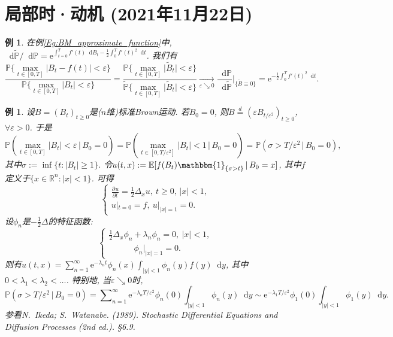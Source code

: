\documentclass{ctexart}
\theoremstyle{definition}
\theoremstyle{remark}
\theoremstyle{plain}
\newtheorem{Eg}[Def]{例}
\newcommand{\1}{\mathbbm{1}}				%
\renewcommand{\P}{\mathbb{P}}				%
\newcommand{\E}{\mathbb{E}}					%
\newcommand{\abs}[1]{\lvert#1\rvert}			%
\newcommand{\R}{\mathbb{R}}					%
\newcommand{\tsum}{\textstyle\sum\nolimits}
\renewcommand*{\d}{\mathop{}\!\mathrm{d}}	%
\newcommand{\pd}{\partial}					%
\newcommand{\p}[3][]{\frac{\pd^{#1}#2}{\pd{#3}^{#1}}}%
\newcommand{\e}{\mathrm{e}}
\begin{document}
\section{局部时·动机 \normalfont\footnotesize (2021年11月22日)}
\begin{Eg}
在例\ref{Eg:BM_approximate_function}中, $\d\tilde{\P}/\d\P = \e^{\int_{t=0}^{T} f'(t) \d B_{t} - \frac{1}{2} \int_{0}^{T} f'(t)^{2} \d t}$. 我们有
\[ \frac{\P\{ \max_{t \in [0,T]} \abs{B_{t}-f(t)} < \varepsilon \}}{\P\{ \max_{t \in [0,T]} \abs{B_{t}} < \varepsilon \}} = \frac{\P\{ \max_{t \in [0,T]} \abs{\tilde{B}_{t}} < \varepsilon \}}{\tilde{\P}\{ \max_{t \in [0,T]} \abs{\tilde{B}_{t}} < \varepsilon \}} \xrightarrow[\varepsilon \searrow 0]{} \frac{\d\P}{\d\tilde{\P}}\bigg|_{\{\tilde{B} \equiv 0\}} = \e^{- \frac{1}{2} \int_{0}^{T} f'(t)^{2} \d t} . \]
\end{Eg}
\begin{Eg}
设$B = (B_{t})_{t \ge 0}$是($n$维)标准Brown运动. 若$B_{0} = 0$, 则$B \stackrel{d}{=} (\varepsilon B_{t/\varepsilon^2})_{t \ge 0}$, $\forall \varepsilon > 0$. 于是
\[ \P( \max_{t \in [0,T]} \abs{B_{t}} < \varepsilon \,|\, B_{0}=0 ) = \P( \max_{t \in [0,T/\varepsilon^{2}]} \abs{B_{t}} < 1 \,|\, B_{0}=0 ) = \P( \sigma > T/\varepsilon^{2} \,|\, B_{0}=0 ) , \] 其中$\sigma := \inf\{ t : \abs{B_{t}} \ge 1 \}$. 
令$u(t,x) := \E[ f(B_{t}) \1_{\{\sigma>t\}} \,|\, B_{0}=x ]$, 其中$f$定义于$\{ x \in \R^{n} : \abs{x} < 1 \}$. \clearpage\noindent
可得\[\begin{cases}
\p{u}{t} = \frac{1}{2} \Delta_{x} u , \ t \ge 0 ,\, \abs{x} < 1 , \\
u|_{t=0} = f , \ u|_{\abs{x}=1} = 0 .
\end{cases}\]
设$\phi_{n}$是$-\frac{1}{2}\Delta$的特征函数: \[\begin{cases}
\frac{1}{2}\Delta_{x}\phi_{n} + \lambda_{n}\phi_{n} = 0 , \ \abs{x}<1 , \\
\qquad\quad\phi_{n}|_{\abs{x}=1} = 0 . 
\end{cases}\]
则有$u(t,x) = \sum_{n=1}^{\infty} \e^{-\lambda_{n}t} \phi_{n}(x) \int_{\abs{y}<1} \phi_{n}(y) f(y) \d y$, 其中$0 < \lambda_{1} < \lambda_{2} < \dots$. 特别地, 当$\varepsilon \searrow 0$时, \[ \P( \sigma > T/\varepsilon^{2} \,|\, B_{0}=0 ) = \tsum_{n=1}^{\infty} \e^{-\lambda_{n}T/\varepsilon^{2}} \phi_{n}(0) \int_{\abs{y}<1} \phi_{n}(y) \d y \sim \e^{-\lambda_{1}T/\varepsilon^{2}} \phi_{1}(0) \int_{\abs{y}<1} \phi_{1}(y) \d y . \]
\normalfont\small\Pickup 参看N.~Ikeda; S.~Watanabe. (1989). \emph{Stochastic Differential Equations and Diffusion Processes} (2nd ed.). \S6.9.
\end{Eg}
\end{document}
